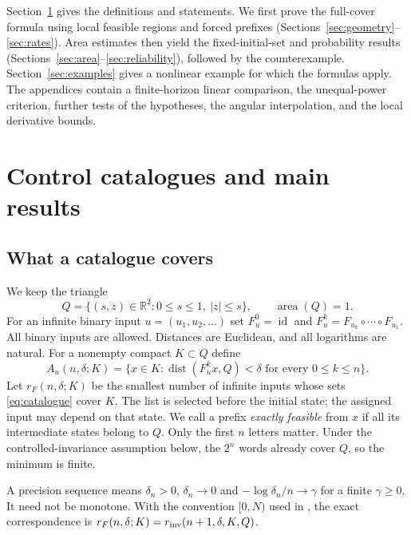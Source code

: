 \documentclass[11pt]{amsart}
\theoremstyle{definition}
\theoremstyle{remark}
\newcommand{\R}{\mathbb R}
\newcommand{\area}{\operatorname{area}}
\newcommand{\dist}{\operatorname{dist}}
\numberwithin{equation}{section}
\begin{document}
Section~\ref{sec:planar} gives the definitions and statements.
We first prove the full-cover formula using local feasible regions
and forced prefixes (Sections~\ref{sec:geometry}--\ref{sec:rates}).
Area estimates then yield the fixed-initial-set and probability
results (Sections~\ref{sec:area}--\ref{sec:reliability}), followed
by the counterexample. Section~\ref{sec:examples} gives a nonlinear
example for which the formulas apply. The appendices contain a
finite-horizon linear comparison, the unequal-power criterion,
further tests of the hypotheses, the angular interpolation, and
the local derivative bounds.

\section{Control catalogues and main results}\label{sec:planar}

\subsection{What a catalogue covers}
We keep the triangle
\[
Q=\{(s,z)\in\R^2:0\le s\le1,\ |z|\le s\},\qquad \area(Q)=1.
\]
For an infinite binary input $u=(u_1,u_2,\ldots)$ set
$F_u^0=\operatorname{id}$ and
$F_u^k=F_{u_k}\circ\cdots\circ F_{u_1}$.
All binary inputs are
allowed. Distances are Euclidean, and all logarithms are natural.
For a nonempty compact $K\subset Q$ define
\begin{equation}\label{eq:catalogue}
A_u(n,\delta;K)=\{x\in K:\dist(F_u^kx,Q)<\delta
                    \text{ for every }0\le k\le n\}.
\end{equation}
Let $r_F(n,\delta;K)$ be the smallest number of infinite inputs
whose sets \eqref{eq:catalogue} cover $K$. The list is selected
before the initial state; the assigned input
may depend on that state. We call a prefix \emph{exactly feasible}
from $x$ if all its intermediate states belong to $Q$.
Only the first $n$ letters matter. Under the controlled-invariance
assumption below, the $2^n$ words already cover $Q$, so the minimum
is finite.

A precision sequence means $\delta_n>0$, $\delta_n\to0$ and
$-\log\delta_n/n\to\gamma$ for a finite $\gamma\ge0$.
It need not be monotone. With the convention $[0,N)$ used in
\cite[Section 2.2]{CZ2024}, the exact correspondence is
$r_F(n,\delta;K)=r_{\rm inv}(n+1,\delta,K,Q)$.
\end{document}
